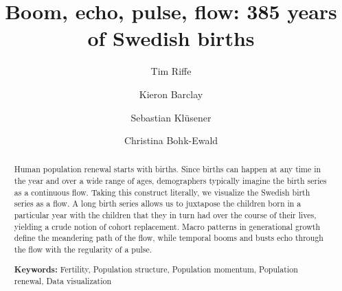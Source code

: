 \documentclass{article}
\begin{document}

\doublespacing
\title{Boom, echo, pulse, flow: 385 years of Swedish births}
  \author[1]{Tim Riffe}
  \author[1,3,4]{Kieron Barclay}
  \author[2]{Sebastian Kl\"usener}
  \author[1]{Christina Bohk-Ewald}
\maketitle

\pagebreak
\begin{abstract}
Human population renewal starts with births. Since births can happen at any
time in the year and over a wide range of ages, demographers typically imagine
the birth series as a continuous flow. Taking this construct literally, we
visualize the Swedish birth series as a flow. A long birth series allows us to
juxtapose the children born in a particular year with the children that
they in turn had over the course of their lives, yielding a crude notion of
cohort replacement. Macro patterns in generational growth define the meandering
path of the flow, while temporal booms and busts echo through the flow with the
regularity of a pulse.
\vspace{1em}

{\bf Keywords:} Fertility, Population structure, Population momentum, Population renewal, Data visualization
\end{abstract}
\end{document}

